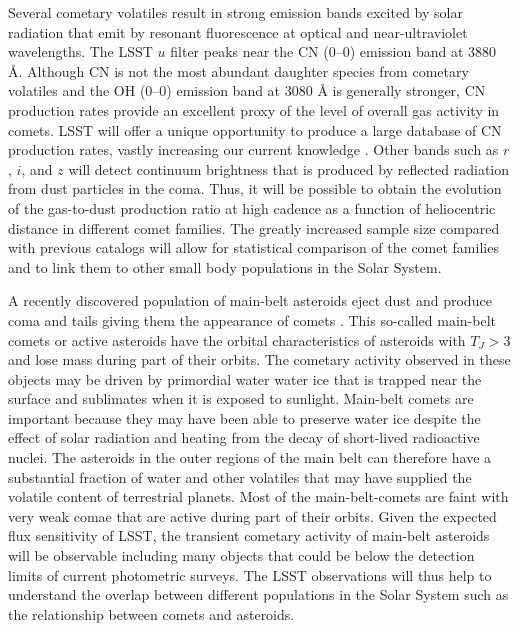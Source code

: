 Several cometary volatiles result in strong emission bands
excited by solar radiation that emit by resonant fluorescence
at optical and near-ultraviolet wavelengths.  The LSST $u$
filter peaks near the CN (0--0) emission band at 3880 \r{A}.
Although CN is not the most abundant daughter species from
cometary volatiles and the OH (0--0) emission band at 3080
\r{A} is generally stronger, CN production rates provide an
excellent proxy of the level of overall gas activity in
comets. LSST will offer a unique opportunity to produce
a large database of CN production rates, vastly increasing our current
knowledge \citep[see
e.g.][]{1995Icar..118..223A, 2012ApJ...758...29A}.
 Other bands such as $r$, $i$, and $z$ will detect
continuum brightness that is produced by reflected radiation
from dust particles in the coma. Thus, it will be possible to
obtain the evolution of the gas-to-dust production ratio at
high cadence as a function of heliocentric distance in
different comet families. The greatly increased sample size
compared with previous catalogs \citep{1995Icar..118..223A}
will allow for statistical comparison of the comet families
and to link them to other small body populations in the Solar
System.

A recently discovered population of main-belt asteroids eject
dust and produce coma and tails giving them the appearance of
comets \citep{2012AJ....143...66J}.  This so-called main-belt
comets or active asteroids have the orbital characteristics of
asteroids with $T_J > 3$ and lose mass during part of their
orbits. The cometary activity observed in these objects may be
driven by primordial water water ice that is trapped near the
surface and sublimates when it is exposed to sunlight.
Main-belt comets are important because they may have been able to
preserve water ice despite the effect of solar radiation and
heating from the decay of short-lived radioactive nuclei.  The
asteroids in the outer regions of the main belt can therefore
have a substantial fraction of water and other volatiles that
may have supplied the volatile content of terrestrial planets.
Most of the main-belt-comets are faint with very weak comae
that are active during part of their orbits. Given the
expected flux sensitivity of LSST, the transient cometary
activity of main-belt asteroids will be observable including
many objects that could be below the detection limits of
current photometric surveys.  The LSST observations will thus
help to understand the overlap between different populations
in the Solar System such as the relationship between comets
and asteroids.

